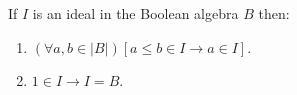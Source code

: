 If $I$ is an ideal in the Boolean algebra $B$ then:
\begin{enumerate}
\item $(\forall a, b \in |B|)[a \leq b \in I \rightarrow a \in I]$.
\item $1 \in I \rightarrow I = B$.
\end{enumerate}
